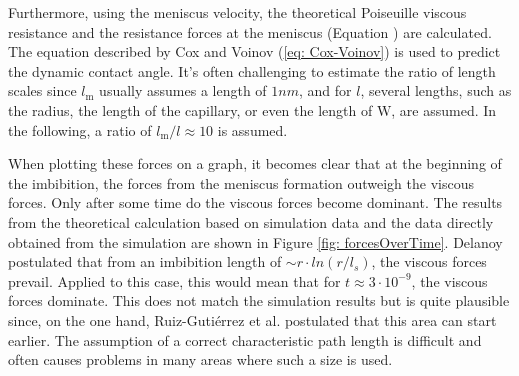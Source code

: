 Furthermore, using the meniscus velocity, the theoretical Poiseuille viscous resistance and the resistance forces at the meniscus (Equation ) are calculated. The equation described by Cox and Voinov (\ref*{eq: Cox-Voinov}) is used to predict the dynamic contact angle. It's often challenging to estimate the ratio of length scales since $l_{\mathrm{m}}$ usually assumes a length of $1nm$, and for $l$, several lengths, such as the radius, the length of the capillary, or even the length of $\mathrm{W}$, are assumed. In the following, a ratio of $l_{\mathrm{m}}/l\approx10$ is assumed.

When plotting these forces on a graph, it becomes clear that at the beginning of the imbibition, the forces from the meniscus formation outweigh the viscous forces. Only after some time do the viscous forces become dominant. The results from the theoretical calculation based on simulation data and the data directly obtained from the simulation are shown in Figure \ref*{fig: forcesOverTime}. Delanoy postulated that from an imbibition length of $\sim r\cdot ln(r/l_s)$, the viscous forces prevail. Applied to this case, this would mean that for $t\approx 3\cdot 10^{-9}$, the viscous forces dominate. This does not match the simulation results but is quite plausible since, on the one hand, Ruiz-Gutiérrez et al. \cite{ruiz2019CapillaryRise} postulated that this area can start earlier. The assumption of a correct characteristic path length is difficult and often causes problems in many areas where such a size is used. 


